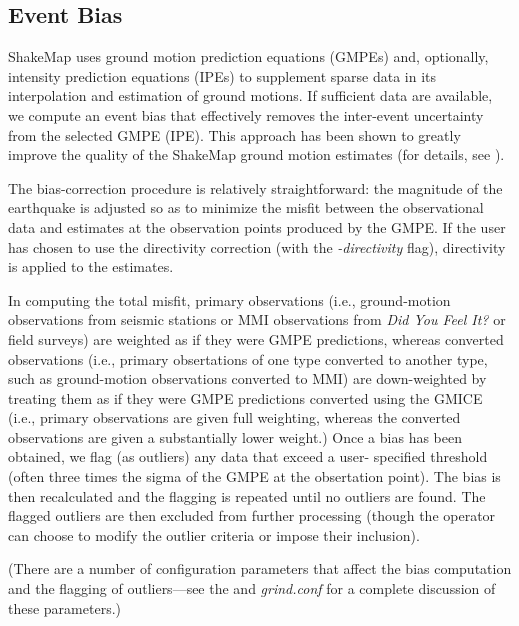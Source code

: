 \documentclass[letterpaper,10pt,english]{sphinxmanual}
\begin{document}
\subsection{Event Bias}
\label{tg_processing:sec-event-bias}\label{tg_processing:event-bias}
ShakeMap uses ground motion prediction equations (GMPEs) and, optionally, intensity prediction
equations (IPEs) to supplement sparse data in its interpolation and estimation of ground
motions. If sufficient data are available, we compute an event bias that effectively
removes the inter-event uncertainty from the selected GMPE (IPE). This approach has
been shown to greatly improve the quality of the ShakeMap ground motion estimates (for
details, see {\hyperref[references:worden2012]{}}).

The bias-correction procedure is relatively straightforward: the magnitude of the
earthquake is adjusted so as to minimize the misfit between the observational data and
estimates at the observation points produced by the GMPE. If the user has chosen to use
the directivity correction (with the \emph{-directivity} flag), directivity is applied to the
estimates.

In computing the total misfit, primary observations (i.e., ground-motion observations from
seismic stations or MMI observations from \emph{Did You Feel It?} or field surveys) are weighted as
if they were GMPE
predictions, whereas converted observations (i.e., primary obsertations of one type converted to
another type, such as ground-motion observations converted to MMI) are down-weighted by treating
them as if they were GMPE predictions converted using the GMICE (i.e., primary observations are
given full weighting, whereas the converted observations are given a substantially lower
weight.) Once a bias has been obtained, we flag (as outliers) any data that exceed a user-
specified threshold (often three times the sigma of the GMPE at the obsertation point). The bias is then
recalculated and the flagging is repeated until no outliers are found. The flagged outliers
are then excluded from further processing (though the operator can choose to modify the
outlier criteria or impose their inclusion).

(There are a number of configuration parameters that affect the bias computation and the
flagging of outliers---see the {\hyperref[software_guide:sm35\string-software\string-guide]{}} and \emph{grind.conf}
for a complete discussion of these parameters.)
\end{document}

